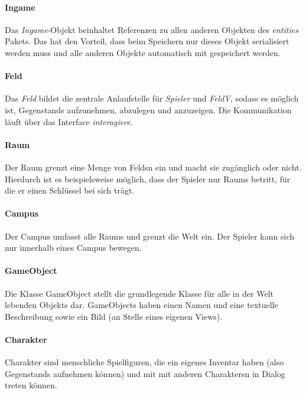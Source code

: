 \paragraph{Ingame}
Das \textit{Ingame}-Objekt beinhaltet Referenzen zu allen anderen Objekten des \textit{entities} 
Pakets. Das hat den Vorteil, dass beim Speichern nur dieses Objekt serialisiert werden muss und alle 
anderen Objekte automatisch mit gespeichert werden.

\paragraph{Feld}
Das \textit{Feld} bildet die zentrale Anlaufstelle für \textit{Spieler} und \textit{FeldV}, sodass 
es möglich ist, \glspl{Gegenstand} aufzunehmen, abzulegen und anzuzeigen. Die Kommunikation läuft 
über das Interface \textit{interagiere}.

\paragraph{Raum}
Der \gls{Raum} grenzt eine Menge von \glspl{Feld}n ein und macht sie zugänglich oder nicht. Hierdurch 
ist es beispielsweise möglich, dass der \gls{Spieler} nur \glspl{Raum} betritt, für die er einen 
Schlüssel bei sich trägt.

\paragraph{Campus}
Der \gls{Campus} umfasst alle \glspl{Raum} und grenzt die \gls{Welt} ein. Der \gls{Spieler} kann sich 
nur innerhalb eines \gls{Campus} bewegen.

\paragraph{GameObject}
Die Klasse \gls{GameObject} stellt die grundlegende Klasse für alle in der \gls{Welt} lebenden \glspl{Objekt}
dar. \glspl{GameObject} haben einen Namen und eine textuelle Beschreibung sowie ein Bild (an Stelle eines
eigenen Views).

\paragraph{Charakter}
\gls{Charakter} sind menschliche Spielfiguren, die ein eigenes \gls{Inventar} haben (also \glspl{Gegenstand}
aufnehmen können) und mit mit anderen \glspl{Charakter}n in \gls{Dialog} treten können.

